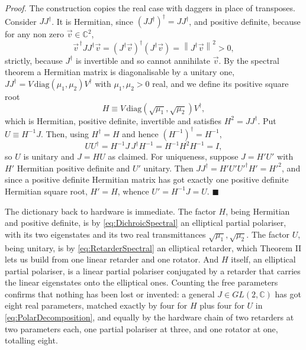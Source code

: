             \textit{Proof.} The construction copies the real case with daggers in place of transposes. Consider $JJ^{\dagger}$. It is Hermitian, since $\left(JJ^{\dagger}\right)^{\dagger}=JJ^{\dagger}$, and positive definite, because for any non zero $\vec{v}\in\mathbb{C}^2$,
            \begin{equation*}
                \vec{v}^{\,\dagger}JJ^{\dagger}\vec{v} = \left(J^{\dagger}\vec{v}\right)^{\dagger}\left(J^{\dagger}\vec{v}\right) = \left\|J^{\dagger}\vec{v}\right\|^2 > 0 ,
            \end{equation*}
            strictly, because $J^{\dagger}$ is invertible and so cannot annihilate $\vec v$. By the spectral theorem a Hermitian matrix is diagonalisable by a unitary one, $JJ^{\dagger}=V\,\text{diag}\left(\mu_1,\mu_2\right)V^{\dagger}$ with $\mu_1,\mu_2>0$ real, and we define its positive square root
            \begin{equation}\label{eq:HermitianSqrt}
                H \equiv V\,\text{diag}\left(\sqrt{\mu_1},\sqrt{\mu_2}\right)V^{\dagger} ,
            \end{equation}
            which is Hermitian, positive definite, invertible and satisfies $H^2=JJ^{\dagger}$. Put $U\equiv H^{-1}J$. Then, using $H^{\dagger}=H$ and hence $\left(H^{-1}\right)^{\dagger}=H^{-1}$,
            \begin{equation*}
                UU^{\dagger} = H^{-1}J\,J^{\dagger}H^{-1} = H^{-1}H^2H^{-1} = I ,
            \end{equation*}
            so $U$ is unitary and $J=HU$ as claimed. For uniqueness, suppose $J=H'U'$ with $H'$ Hermitian positive definite and $U'$ unitary. Then $JJ^{\dagger}=H'U'U'^{\dagger}H'=H'^2$, and since a positive definite Hermitian matrix has got exactly one positive definite Hermitian square root, $H'=H$, whence $U'=H^{-1}J=U$. $\blacksquare$

            The dictionary back to hardware is immediate. The factor $H$, being Hermitian and positive definite, is by \ref{eq:DichroicSpectral} an elliptical partial polariser, with its two eigenstates and its two real transmittances $\sqrt{\mu_1},\sqrt{\mu_2}$. The factor $U$, being unitary, is by \ref{eq:RetarderSpectral} an elliptical retarder, which Theorem II lets us build from one linear retarder and one rotator. And $H$ itself, an elliptical partial polariser, is a linear partial polariser conjugated by a retarder that carries the linear eigenstates onto the elliptical ones. Counting the free parameters confirms that nothing has been lost or invented: a general $J\in GL(2,\mathbb{C})$ has got eight real parameters, matched exactly by four for $H$ plus four for $U$ in \ref{eq:PolarDecomposition}, and equally by the hardware chain of two retarders at two parameters each, one partial polariser at three, and one rotator at one, totalling eight.

